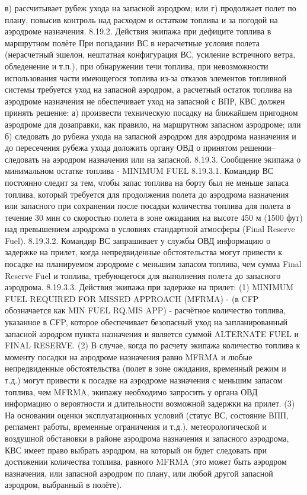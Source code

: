 в)	рассчитывает рубеж ухода на запасной аэродром; или
г)	продолжает полет по плану, повысив контроль над расходом и остатком топлива и за погодой на аэродроме назначения.
8.19.2.	Действия экипажа при дефиците топлива в маршрутном полёте
При попадании ВС в нерасчетные условия полета (нерасчетный эшелон, нештатная конфигурация ВС, усиление встречного ветра, обледенение и т.п.), при обнаружении течи топлива, при невозможности использования части имеющегося топлива из-за отказов элементов топливной системы требуется уход на запасной аэродром, а расчетный остаток топлива на аэродроме назначения не обеспечивает уход на запасной с ВПР, КВС должен принять решение:
а)	произвести техническую посадку на ближайшем пригодном аэродроме для дозаправки, как правило, на маршрутном запасном аэродроме; или
б)	следовать до рубежа ухода на запасной аэродром для аэродрома назначения и до пересечения рубежа ухода доложить органу ОВД о принятом решении–следовать на аэродром назначения или на запасной.
8.19.3.	Сообщение экипажа о минимальном остатке топлива - MINIMUM FUEL
8.19.3.1. Командир ВС постоянно следит за тем, чтобы запас топлива на борту был не меньше запаса топлива, который требуется для продолжения полета до аэродрома назначения или запасного при сохранении после посадки количества топлива для полета в течение 30 мин со скоростью полета в зоне ожидания на высоте 450 м (1500 фут) над превышением аэродрома в условиях стандартной атмосферы (Final Reserve Fuel).
8.19.3.2. Командир ВС запрашивает у службы ОВД информацию о задержке на прилет, когда непредвиденные обстоятельства могут привести к посадке на планируемом аэродроме с меньшим запасом топлива, чем сумма Final Reserve Fuel и топлива, требующегося для выполнения полета до запасного аэродрома.
8.19.3.3. Действия экипажа при задержке на прилет:
(1) MINIMUM FUEL REQUIRED FOR MISSED APPROACH (MFRMA) - (в CFP обозначается как MIN FUEL RQ.MIS APP) - расчётное количество топлива, указанное в СFP, которое обеспечивает безопасный уход на запланированный запасной аэродром пункта назначения и является суммой ALTERNATE FUEL и FINAL RESERVE. 
(2) В случае, когда по расчету экипажа количество топлива к моменту посадки на аэродроме назначения равно MFRMA и любые непредвиденные обстоятельства (полет в зоне ожидания, временный режим и т.д.) могут привести к посадке на аэродроме назначения с меньшим запасом топлива, чем MFRMA, экипажу необходимо запросить у органа ОВД информацию о вероятности и длительности возможной задержки на прилет.
(3) На основании оценки эксплуатационных условий (статус ВС, состояние ВПП, регламент работы, временные ограничения и т.д.), метеорологической и воздушной обстановки в районе аэродрома назначения и запасного аэродрома, КВС имеет право выбрать аэродром, на который он будет следовать при достижении количества топлива, равного MFRMA (это может быть аэродром назначения, или запасной аэродром по плану, или любой другой запасной аэродром, выбранный в полёте).
